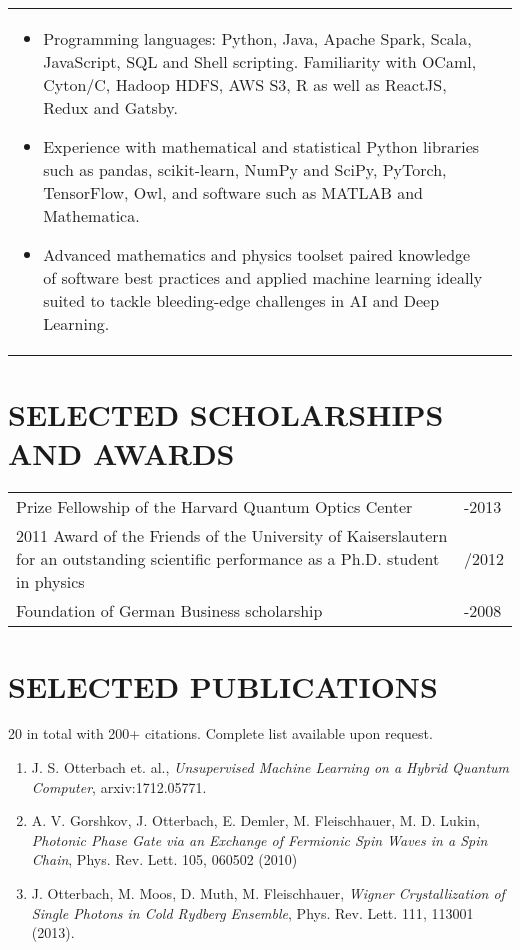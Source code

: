 \documentclass[10pt,centered]{./res} %
\begin{document}
\begin{resume}
\vspace*{0.2cm}
\hspace*{-.9cm}
\begin{tabular}{p{5.85in}>{\raggedleft\arraybackslash}p{.1in}}
\begin{itemize}
  \item Programming languages: Python, Java, Apache Spark, Scala, JavaScript, SQL and Shell scripting. Familiarity with OCaml, Cyton/C, Hadoop HDFS, AWS S3, R as well as ReactJS, Redux and Gatsby.
  \item Experience with mathematical and statistical Python libraries such as pandas, scikit-learn, NumPy and SciPy, PyTorch, TensorFlow, Owl, and software such as MATLAB and {\sc Mathematica}.
  \item Advanced mathematics and physics toolset paired knowledge of software best practices and applied machine learning ideally suited to tackle bleeding-edge challenges in AI and Deep Learning.
\end{itemize}
 & \\
\end{tabular}

\vspace*{-0.2cm}
\section{\color{ResumeBlue}SELECTED SCHOLARSHIPS AND AWARDS}
\vspace*{0.2cm}
\hspace*{-.3cm}
\begin{tabular}{p{5.0in}>{\raggedleft\arraybackslash}p{.85in}}
  {Prize Fellowship} of the Harvard Quantum Optics Center
 &  2011-2013 \\
  {2011 Award} of the Friends of the University of Kaiserslautern for an outstanding scientific performance as a Ph.D. student in physics
 & 6/2012 \\
  {Foundation of German Business} scholarship
 & 2005-2008 \\
\end{tabular}

\section{\color{ResumeBlue}SELECTED PUBLICATIONS}
\vspace*{0.2cm}
20 in total with 200+ citations. Complete list available upon request.\vspace*{.2cm}
\begin{enumerate}
 \item J. S. Otterbach et. al., \textit{Unsupervised Machine Learning on a Hybrid Quantum Computer}, arxiv:1712.05771.
 \item A. V. Gorshkov, J. Otterbach, E. Demler, M. Fleischhauer, M. D. Lukin, \textit{Photonic Phase Gate via an Exchange of Fermionic Spin Waves in a Spin Chain}, Phys. Rev. Lett. 105, 060502 (2010)
 \item {J. Otterbach}, M. Moos, D. Muth, M. Fleischhauer, \textit{Wigner Crystallization of Single Photons in Cold Rydberg Ensemble}, Phys. Rev. Lett. {111}, 113001 (2013).


\end{enumerate}
\end{resume}
\end{document}
